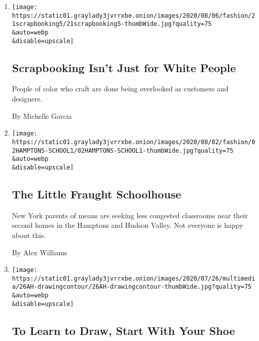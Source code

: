 \begin{enumerate}
\def\labelenumi{\arabic{enumi}.}
\item
  \href{/2020/08/05/style/scrapbooking-blm-black-lives-matter.html}{}

  \texttt{[image: https://static01.graylady3jvrrxbe.onion/images/2020/08/06/fashion/21scrapbooking5/21scrapbooking5-thumbWide.jpg?quality=75\\\&auto=webp\\\&disable=upscale]}

  \hypertarget{scrapbooking-isnt-just-for-white-people}{%
  \subsection{Scrapbooking Isn't Just for White
  People}\label{scrapbooking-isnt-just-for-white-people}}

  People of color who craft are done being overlooked as customers and
  designers.

  By Michelle Garcia
\item
  \href{/2020/08/01/style/wealthy-rich-parents-coronavirus-schools-hamptons.html}{}

  \texttt{[image: https://static01.graylady3jvrrxbe.onion/images/2020/08/02/fashion/02HAMPTONS-SCHOOL1/02HAMPTONS-SCHOOL1-thumbWide.jpg?quality=75\\\&auto=webp\\\&disable=upscale]}

  \hypertarget{the-little-fraught-schoolhouse}{%
  \subsection{The Little Fraught
  Schoolhouse}\label{the-little-fraught-schoolhouse}}

  New York parents of means are seeking less congested classrooms near
  their second homes in the Hamptons and Hudson Valley. Not everyone is
  happy about this.

  By Alex Williams
\item
  \href{/2020/07/25/at-home/coronavirus-learn-to-draw.html}{}

  \texttt{[image: https://static01.graylady3jvrrxbe.onion/images/2020/07/26/multimedia/26AH-drawingcontour/26AH-drawingcontour-thumbWide.jpg?quality=75\\\&auto=webp\\\&disable=upscale]}

  \hypertarget{to-learn-to-draw-start-with-your-shoe}{%
  \subsection{To Learn to Draw, Start With Your
  Shoe}\label{to-learn-to-draw-start-with-your-shoe}}


\end{enumerate}
